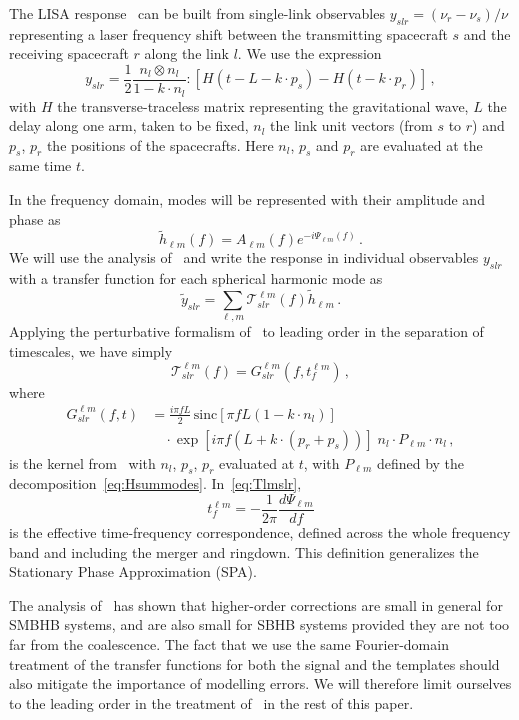\documentclass[aps,showpacs,twocolumn,prd,superscriptaddress,nofootinbib]{revtex4-1}
\newcommand{\be}{\begin{equation}}
\newcommand{\ee}{\end{equation}}
\newcommand\calT{{\mathcal{T}}}
\newcommand{\nn}{\nonumber}
\newcommand{\sinc}{\,\mathrm{sinc}}
\begin{document}
The LISA response~\cite{EW75, Cutler97, Larson+99, CR02, RCP04} can be built from single-link observables $y_{slr} = (\nu_{r} - \nu_{s})/\nu$ representing a laser frequency shift between the transmitting spacecraft $s$ and the receiving spacecraft $r$ along the link $l$. We use the expression~\cite{Vallisneri04, Krolak+04}
\be\label{eq:defyslr}
	y_{slr} = \frac{1}{2} \frac{n_{l} \otimes n_{l}}{1 - k\cdot n_{l}} : \left[ H(t - L - k\cdot p_{s}) - H(t - k\cdot p_{r}) \right] \,,
\ee
with $H$ the transverse-traceless matrix representing the gravitational wave, $L$ the delay along one arm, taken to be fixed, $n_{l}$ the link unit vectors (from $s$ to $r$) and $p_{s}$, $p_{r}$ the positions of the spacecrafts. Here $n_{l}$, $p_{s}$ and $p_{r}$ are evaluated at the same time $t$.

In the frequency domain, modes will be represented with their amplitude and phase as
\be\label{eq:hlmampphase}
	\tilde{h}_{\ell m} (f) = A_{\ell m} (f) e^{-i\Psi_{\ell m} (f)}\,.
\ee
We will use the analysis of~\cite{MB18} and write the response in individual observables $y_{slr}$ with a transfer function for each spherical harmonic mode as
\be
	\tilde{y}_{slr} = \sum_{\ell, m}\calT_{slr}^{\ell m}(f) \tilde{h}_{\ell m} \,.
\ee
Applying the perturbative formalism of~\cite{MB18} to leading order in the separation of timescales, we have simply
\be\label{eq:Tlmslr}
	\calT_{slr}^{\ell m}(f) = G_{slr}^{\ell m}(f, t_{f}^{\ell m}) \,,
\ee
where
\begin{align}\label{eq:Gslr}
	G_{slr}^{\ell m}(f,t) &= \frac{i \pi f L}{2} \sinc \left[ \pi f L\left(1-k\cdot n_{l} \right) \right] \nn\\
	& \quad \cdot \exp\left[ i \pi f \left( L + k\cdot \left( p_{r} + p_{s} \right) \right) \right] \; n_{l} \cdot P_{\ell m} \cdot n_{l} \,,
\end{align}
is the kernel from~\cite{MB18} with $n_{l}$, $p_{s}$, $p_{r}$ evaluated at $t$, with $P_{\ell m}$ defined by the decomposition~\eqref{eq:Hsummodes}. In~\eqref{eq:Tlmslr},
\be\label{eq:deftflm}
	t_{f}^{\ell m} = -\frac{1}{2\pi} \frac{d\Psi_{\ell m}}{df}
\ee
is the effective time-frequency correspondence, defined across the whole frequency band and including the merger and ringdown. This definition generalizes the Stationary Phase Approximation (SPA).

The analysis of~\cite{MB18} has shown that higher-order corrections are small in general for SMBHB systems, and are also small for SBHB systems provided they are not too far from the coalescence. The fact that we use the same Fourier-domain treatment of the transfer functions for both the signal and the templates should also mitigate the importance of modelling errors. We will therefore limit ourselves to the leading order in the treatment of~\cite{MB18} in the rest of this paper.
\end{document}
